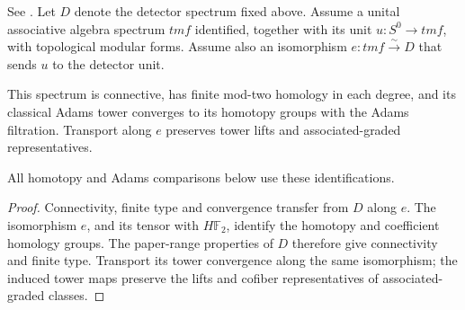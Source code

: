 \begin{definition}
\label{sem:Literature:tmf-unit}
\label{sem:Literature:tmf-convergence}
See \cite[Sections 0.1 and 1.2]{BR21}. Let $D$ denote the detector
spectrum fixed above. Assume a unital associative algebra spectrum
$\mathit{tmf}$ identified, together with its unit
$u:S^0\to\mathit{tmf}$, with topological modular forms. Assume also
an isomorphism $e:\mathit{tmf}\xrightarrow{\sim}D$ that sends $u$ to
the detector unit.

This spectrum is connective, has finite mod-two homology in each
degree, and its classical Adams tower converges to its homotopy groups
with the Adams filtration. Transport along $e$ preserves tower lifts
and associated-graded representatives.

All homotopy and Adams comparisons below use these identifications.

\end{definition}
\begin{proof}
Connectivity, finite type and convergence transfer from $D$ along $e$.
The isomorphism $e$, and its tensor with $H\mathbb F_2$, identify the
homotopy and coefficient homology groups. The paper-range properties of
$D$ therefore give connectivity and finite type. Transport its tower
convergence along the same isomorphism; the induced tower maps preserve
the lifts and cofiber representatives of associated-graded classes.
\end{proof}

